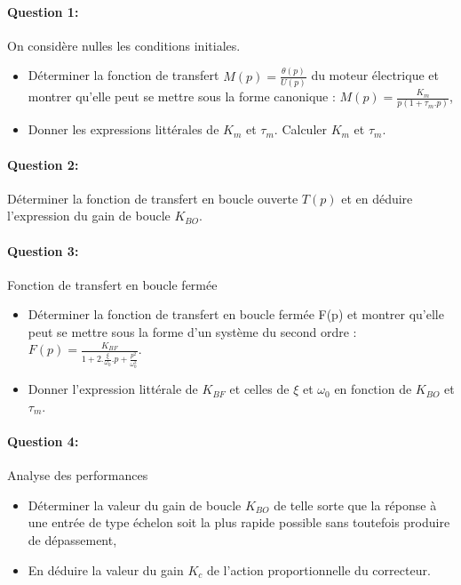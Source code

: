 \paragraph{Question 1:} On considère nulles les conditions initiales.

\begin{itemize}
 \item Déterminer la fonction de transfert $M(p)=\frac{\theta(p)}{U(p)}$ du moteur électrique et montrer qu'elle peut se mettre sous la forme canonique : $M(p)=\frac{K_m}{p(1+\tau_m.p)}$,
 \item Donner les expressions littérales de $K_m$ et $\tau_m$. Calculer $K_m$ et $\tau_m$.
\end{itemize}

\paragraph{Question 2:} Déterminer la fonction de transfert en boucle ouverte $T(p)$ et en déduire l'expression du gain de boucle $K_{BO}$.

\paragraph{Question 3:} Fonction de transfert en boucle fermée

\begin{itemize}
 \item Déterminer la fonction de transfert en boucle fermée F(p) et montrer qu'elle peut se mettre sous la forme d'un système du second ordre : $F(p)=\frac{K_{BF}}{1+2.\frac{\xi}{\omega_0}.p+\frac{p^2}{\omega_0^2}}$.
 \item Donner l'expression littérale de $K_{BF}$ et celles de $\xi$ et $\omega_0$ en fonction de $K_{BO}$ et $\tau_m$.
\end{itemize}

\paragraph{Question 4:} Analyse des performances

\begin{itemize}
 \item Déterminer la valeur du gain de boucle $K_{BO}$ de telle sorte que la réponse à une entrée de type échelon soit la plus rapide possible sans toutefois produire de dépassement,
 \item En déduire la valeur du gain $K_c$ de l'action proportionnelle du correcteur.
\end{itemize}

